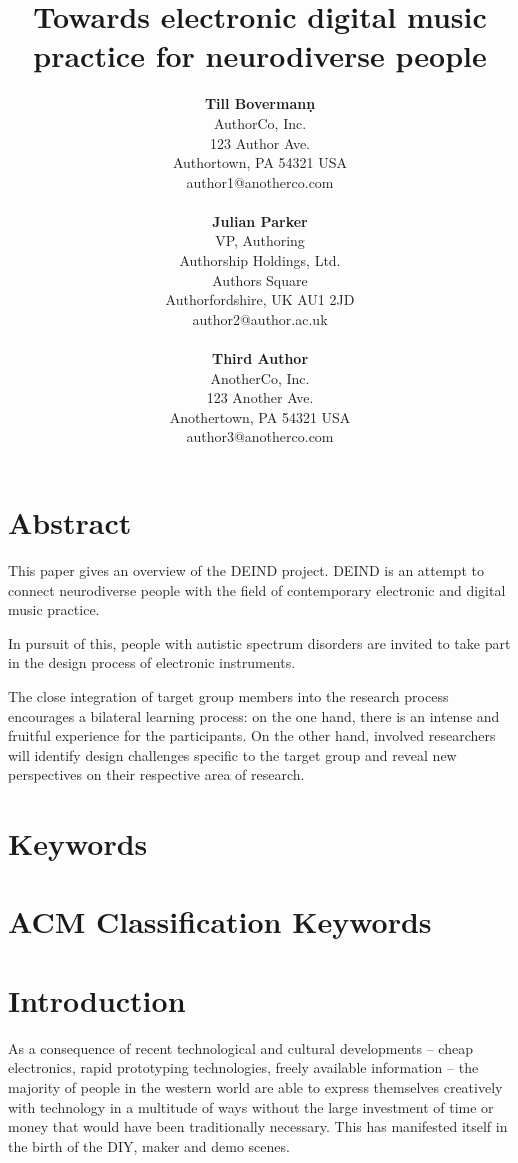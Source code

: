 \documentclass{chi-ext}
\title{Towards electronic digital music practice for neurodiverse people}
\author{
  \textbf{Till Bovermanṇ} \\
  AuthorCo, Inc. \\
  123 Author Ave. \\
  Authortown, PA 54321 USA \\
  author1@anotherco.com \\
  \\
  \textbf{Julian Parker} \\
  VP, Authoring \\
  Authorship Holdings, Ltd. \\
  Authors Square \\
  Authorfordshire, UK AU1 2JD \\
  author2@author.ac.uk \\
  \\
  \textbf{Third Author} \\
  AnotherCo, Inc. \\
  123 Another Ave. \\
  Anothertown, PA 54321 USA \\
  author3@anotherco.com \\
}
\begin{document}
\maketitle

\begin{multicols}{2}
  
\makeauthors
\makecopyright

\section{Abstract}
This paper gives an overview of the DEIND project. DEIND is an attempt to connect neurodiverse people with the field of contemporary electronic and digital music practice. 

In pursuit of this, people with autistic spectrum disorders are invited to take part in the design process of electronic instruments.

The close integration of target group members into the research process encourages a bilateral learning process: on the one hand, there is an intense and fruitful experience for the participants. On the other hand, involved researchers will identify design challenges specific to the target group and reveal new perspectives on their respective area of research.

\section{Keywords}
\makeatletter \@keywords \makeatother

\section{ACM Classification Keywords}
\makeatletter \@acmclassification \makeatother


\section{Introduction}

As a consequence of recent technological and cultural developments -- cheap electronics, rapid prototyping technologies, freely available information -- the majority of people in the western world are able to express themselves creatively with technology in a multitude of ways without the large investment of time or money that would have been traditionally necessary. This has manifested itself in the birth of the DIY, maker and demo scenes.


\end{multicols}
\end{document}
